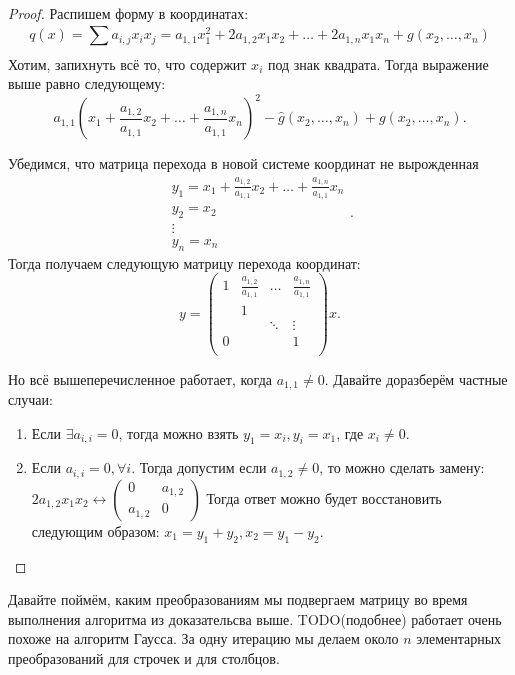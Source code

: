 \begin{proof}
    Распишем форму в координатах:
    \[
        q(x) = \sum\limits_{}^{}{a_{i,j} x_i x_j} = a_{1,1}x_1^2 + 2a_{1,2}x_1x_2 + \dots + 2a_{1,n}x_1x_n +
        g(x_2,\dots, x_n)
    \]
    Хотим, запихнуть всё то, что содержит $x_i$ под знак квадрата.
    Тогда выражение выше равно следующему:
    \[
        a_{1,1}\left(x_1 + \frac{a_{1,2}}{a_{1,1}}x_2 + \dots + \frac{a_{1,n}}{a_{1,1}}x_n\right)^2 -
        \hat{g}(x_2,\dots, x_n) + g(x_2,\dots, x_n)
    .\]
    
    Убедимся, что матрица перехода в новой системе координат не вырожденная
     \[
         \begin{gathered}
             y_1 = x_1 + \frac{a_{1,2}}{a_{1,1}}x_2 + \dots + \frac{a_{1,n}}{a_{1,1}}x_n\\
             y_2 = x_2\\
             \vdots\\
             y_n = x_n
         \end{gathered}
    .\] 
    Тогда получаем следующую матрицу перехода координат:
    \[
    y = 
    \begin{pmatrix}
        1 & \frac{a_{1,2}}{a_{1,1}} & \dots & \frac{a_{1,n}}{a_{1,1}}\\
          & 1 & &\\
          &  & \ddots &\vdots\\
          0 & & & 1\\
    \end{pmatrix} x
    .\] 

    Но всё вышеперечисленное работает, когда $a_{1,1}\not= 0$.
    Давайте доразберём частные случаи:
    \begin{enumerate}
        \item
        Если $\exists a_{i,i} = 0$, тогда можно взять $y_1 = x_i, y_i = x_1$, где $x_i \neq 0$.
        \item
            Если $a_{i,i} = 0,\forall i$. Тогда допустим если $a_{1,2}\not=0$, то можно сделать замену:
        $2a_{1,2} x_1 x_2 \leftrightarrow
        \begin{pmatrix}
            0 & a_{1,2}\\
            a_{1, 2} & 0
        \end{pmatrix}$
        Тогда ответ можно будет восстановить следующим образом:
        $x_1 = y_1 + y_2, x_2 = y_1 - y_2$.
    \end{enumerate}
\end{proof}
Давайте поймём, каким преобразованиям мы подвергаем матрицу во время выполнения алгоритма из доказательсва
выше.
TODO(подобнее) работает очень похоже на алгоритм Гаусса. За одну итерацию мы делаем около $n$ элементарных
преобразований для строчек и для столбцов.
